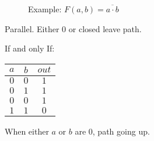 \documentclass[a4paper,12pt]{article}
\begin{document}
\begin{figure}[hbt] 
\centering 



\label{NAND Gate} 

\end{figure} 

\begin{figure}[h]
\centering 



\label{NAND Gate} 

\caption{Example: $F(a, b) = \overline{a \cdot b}$}

\end{figure}

Parallel. Either $0$ or closed leave path.

If and only If:

\begin{tabular}{|c|c|c|}
\hline
$a$	&	$b$	&	$out$	\\
\hline
$0$	&	$0$	&	$1$	\\
\hline
$0$	&	$1$	&	$1$	\\
\hline
$0$	&	$0$	&	$1$	\\
\hline
$1$	&	$1$	&	$0$	\\
\hline
\end{tabular}

When either $a$ or $b$ are $0$, path going up.
\end{document}
